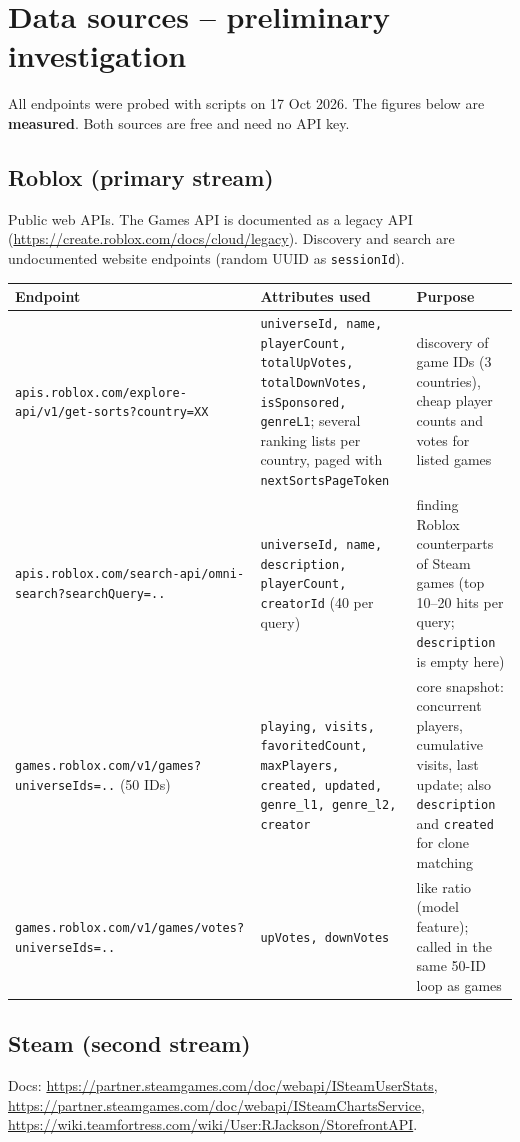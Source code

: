 \documentclass[10pt,a4paper]{article}
\newcommand{\ep}[1]{\texttt{\small #1}}
\newcommand{\eu}[1]{{\small\nolinkurl{#1}}}
\begin{document}
\section{Data sources -- preliminary investigation}
All endpoints were probed with scripts on 17 Oct 2026. The figures below are \textbf{measured}. Both sources are free and need no API key.

\subsection{Roblox (primary stream)}
Public web APIs. The Games API is documented as a legacy API (\url{https://create.roblox.com/docs/cloud/legacy}). Discovery and search are undocumented website endpoints (random UUID as \ep{sessionId}).

{\small
\begin{longtable}{L{4.4cm} L{5.9cm} L{5.4cm}}
\toprule
\textbf{Endpoint} & \textbf{Attributes used} & \textbf{Purpose}\\
\midrule\endhead
\eu{apis.roblox.com/explore-api/v1/get-sorts?country=XX} & \ep{universeId, name, playerCount, totalUpVotes, totalDownVotes, isSponsored, genreL1}; several ranking lists per country, paged with \ep{nextSortsPageToken} & discovery of game IDs (3 countries), cheap player counts and votes for listed games\\
\eu{apis.roblox.com/search-api/omni-search?searchQuery=..} & \ep{universeId, name, description, playerCount, creatorId} (40 per query) & finding Roblox counterparts of Steam games (top 10--20 hits per query; \ep{description} is empty here)\\
\eu{games.roblox.com/v1/games?universeIds=..} (50 IDs) & \ep{playing, visits, favoritedCount, maxPlayers, created, updated, genre\_l1, genre\_l2, creator} & core snapshot: concurrent players, cumulative visits, last update; also \ep{description} and \ep{created} for clone matching\\
\eu{games.roblox.com/v1/games/votes?universeIds=..} & \ep{upVotes, downVotes} & like ratio (model feature); called in the same 50-ID loop as games\\
\bottomrule
\end{longtable}}

\subsection{Steam (second stream)}
\begin{sloppypar}Docs: \url{https://partner.steamgames.com/doc/webapi/ISteamUserStats}, \url{https://partner.steamgames.com/doc/webapi/ISteamChartsService}, \url{https://wiki.teamfortress.com/wiki/User:RJackson/StorefrontAPI}.\end{sloppypar}
\end{document}
